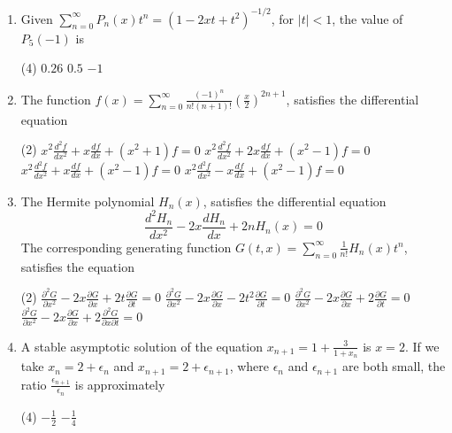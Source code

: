 \begin{enumerate}[label=\color{ocre}\textbf{\arabic*.}]
	\item   Given $\sum_{n=0}^{\infty} P_{n}(x) t^{n}=\left(1-2 x t+t^{2}\right)^{-1 / 2}$, for $|t|<1$, the value of $P_{5}(-1)$ is
	{}
	\begin{tasks}(4)
		\task[\textbf{A.}] $0.26$
		\task[\textbf{C.}] $0.5$
		\task[\textbf{D.}] $-1$
	\end{tasks}
	\item The function $f(x)=\sum_{n=0}^{\infty} \frac{(-1)^{n}}{n !(n+1) !}\left(\frac{x}{2}\right)^{2 n+1}$, satisfies the differential equation
	{}
	\begin{tasks}(2)
		\task[\textbf{A.}]  $x^{2} \frac{d^{2} f}{d x^{2}}+x \frac{d f}{d x}+\left(x^{2}+1\right) f=0$
		\task[\textbf{B.}]  $x^{2} \frac{d^{2} f}{d x^{2}}+2 x \frac{d f}{d x}+\left(x^{2}-1\right) f=0$
		\task[\textbf{C.}] $x^{2} \frac{d^{2} f}{d x^{2}}+x \frac{d f}{d x}+\left(x^{2}-1\right) f=0$
		\task[\textbf{D.}] $x^{2} \frac{d^{2} f}{d x^{2}}-x \frac{d f}{d x}+\left(x^{2}-1\right) f=0$
	\end{tasks}
	\item
	 The Hermite polynomial $H_{n}(x)$, satisfies the differential equation
	$$
	\frac{d^{2} H_{n}}{d x^{2}}-2 x \frac{d H_{n}}{d x}+2 n H_{n}(x)=0
	$$
	The corresponding generating function $G(t, x)=\sum_{n=0}^{\infty} \frac{1}{n !} H_{n}(x) t^{n}$, satisfies the equation
	{}
	\begin{tasks}(2)
		\task[\textbf{A.}] $\frac{\partial^{2} G}{\partial x^{2}}-2 x \frac{\partial G}{\partial x}+2 t \frac{\partial G}{\partial t}=0$
		\task[\textbf{B.}] $\frac{\partial^{2} G}{\partial x^{2}}-2 x \frac{\partial G}{\partial x}-2 t^{2} \frac{\partial G}{\partial t}=0$
		\task[\textbf{C.}] $\frac{\partial^{2} G}{\partial x^{2}}-2 x \frac{\partial G}{\partial x}+2 \frac{\partial G}{\partial t}=0$
		\task[\textbf{D.}]  $\frac{\partial^{2} G}{\partial x^{2}}-2 x \frac{\partial G}{\partial x}+2 \frac{\partial^{2} G}{\partial x \partial t}=0$
	\end{tasks}
	\item A stable asymptotic solution of the equation $x_{n+1}=1+\frac{3}{1+x_{n}}$ is $x=2$. If we take $x_{n}=2+\epsilon_{n}$ and $x_{n+1}=2+\epsilon_{n+1}$, where $\epsilon_{n}$ and $\epsilon_{n+1}$ are both small, the ratio $\frac{\epsilon_{n+1}}{\epsilon_{n}}$ is approximately
	{}
	\begin{tasks}(4)
		\task[\textbf{A.}] $-\frac{1}{2}$
		\task[\textbf{B.}] $-\frac{1}{4}$

\end{tasks}
\end{enumerate}
